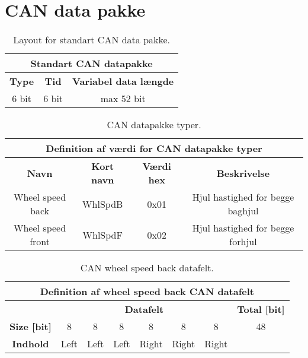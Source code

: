\section{CAN data pakke}

\begin{table}[H] \centering
	\begin{tabular}{|c|c|c|}
        \hline \multicolumn{3}{|c|}{\textbf{Standart CAN datapakke}} \\
	    \hline \hline \textbf{Type} & \textbf{Tid}& \textbf{Variabel data længde}\\
        \hline 6 bit & 6 bit & max 52 bit \\ 
        \hline
    \end{tabular}
\caption{Layout for standart CAN data pakke.}
\label{table:std_can_pakke}
\end{table}

\begin{table}[H] \centering
	\begin{tabular}{|c|c|c|c|}
        \hline \multicolumn{4}{|c|}{\textbf{Definition af værdi for CAN datapakke typer}} \\
	    \hline \hline \textbf{Navn} & \textbf{Kort navn} & \textbf{Værdi hex}& \textbf{Beskrivelse}\\
        \hline Wheel speed back & WhlSpdB & 0x01 & Hjul hastighed for begge baghjul\\
        \hline Wheel speed front & WhlSpdF & 0x02 & Hjul hastighed for begge forhjul\\
        \hline
    \end{tabular}
\caption{CAN datapakke typer.}
\label{table:CAN_data_typer}
\end{table}

\begin{table}[H] \centering
	\begin{tabular}{|c||c|c|c|c|c|c|c|}
        \hline \multicolumn{8}{|c|}{\textbf{Definition af wheel speed back CAN datafelt}} \\
	    \hline \hline & \multicolumn{6}{|c|}{\textbf{Datafelt}} & \textbf{Total [bit]}\\ 
        \hline \textbf{Size [bit]} & 8 & 8 & 8 & 8 & 8 & 8 & 48 \\
        \hline \textbf{Indhold} & Left & Left & Left & Right & Right & Right & \\
        \hline
    \end{tabular}
\caption{CAN wheel speed back datafelt.}
\label{table:CAN_WhlSpdB_pakke}
\end{table}

